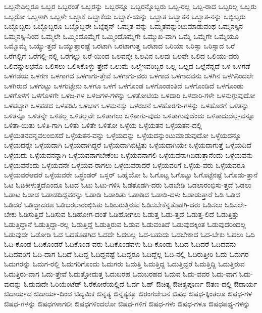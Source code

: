{ಒಬ್ಬನೇಎಲ್ಲರೂ
ಒಬ್ಬರ
ಒಬ್ಬರಂತೆ
ಒಬ್ಬರನ್ನು
ಒಬ್ಬರನ್ನೂ
ಒಬ್ಬರನ್ನೊಬ್ಬರು
ಒಬ್ಬ-ರಲ್ಲ
ಒಬ್ಬ-ರಾದ
ಒಬ್ಬರಿಲ್ಲ
ಒಬ್ಬರು
ಒಬ್ಬರೋ
ಒಬ್ಬಳಾಗಿ
ಒಬ್ಬಳೇ
ಒಬ್ಬಾಕೆ
ಒಬ್ಬಾಕೆಯ
ಒಬ್ಬಾಕೆ-ಯನ್ನು
ಒಬ್ಬಾತ
ಒಬ್ಬಾತನ
ಒಬ್ಬಾತ-ನನ್ನು
ಒಬ್ಬಿಬ್ಬರು
ಒಬ್ಬೊಬ್ಬರು
ಒಬ್ಬೊಬ್ಬರೂ
ಒಬ್ಬೊಬ್ಬರೇ
ಒಬ್ಸೆಶ್ಶನ್
ಒಮ್ಮತ-ವನ್ನು
ಒಮ್ಮತವನ್ನುಂಟುಮಾಡುವಂಥ
ಒಮ್ಮನಸ್ಸಿನ
ಒಮ್ಮನಸ್ಸಿ-ನಿಂದ
ಒಮ್ಮಲೇ
ಒಮ್ಮಿಂದೊಮ್ಮೆಗೆ
ಒಮ್ಮಿಂದೊಮ್ಮೆಗೇ
ಒಮ್ಮುಖ-ವಾಗಿ
ಒಮ್ಮೆ
ಒಮ್ಮೆಗೇ
ಒಮ್ಮೆಯೂ
ಒಮ್ಮೊಮ್ಮೆ
ಒಯ್ಯು-ತ್ತದೆ
ಒಯ್ಯುತ್ತಾರಷ್ಟೆ
ಒರಟಾಗಿ
ಒರಟಾಗುತ್ತ
ಒರಟಾದ
ಒರಿಯಾ
ಒರಿಸ್ಸಾ
ಒರಿಸ್ಸಾದ
ಒರೆ
ಒರೆಗಲ್ಲಿಗೆ
ಒರೆಗಲ್ಲಿ-ನಲ್ಲಿ
ಒರೆಗಲ್ಲು
ಒರೆ-ಯಿಂದ
ಒಲವನ್ನೇ
ಒಲವಿನ
ಒಲವು
ಒಲವೇ
ಒಲಿದ
ಒಲಿಯು-ವರು
ಒಲಿವನ್ಸುಲಭನೊ
ಒಲಿಸಲು
ಒಲಿಸಿಕೊಳ್ಳು-ತ್ತೇನೆ
ಒಲುಮೆ
ಒಲ್ಮೆಇವರಿಬ್ಬರ
ಒಲ್ಲ
ಒಲ್ಲದ
ಒಲ್ಲೆನೆನ್ನದೆ
ಒಳ
ಒಳಗಡೆ
ಒಳಗಡೆಯ
ಒಳಗಣ
ಒಳಗಾಗದ
ಒಳಗಾಗು-ತ್ತೇವೆ
ಒಳಗಾಗು-ವರು
ಒಳಗಾದ
ಒಳಗಾದವನು
ಒಳಗಿನ
ಒಳಗಿನಿಂದಲೇ
ಒಳಗಿರುವ
ಒಳಗುಟ್ಟು
ಒಳಗುಟ್ಟೇನು
ಒಳಗೂ
ಒಳಗೆ
ಒಳಗೊಂಡ
ಒಳಗೊಂಡಂತಿದೆ
ಒಳಗೊಂಡಿದೆ
ಒಳಗೊಂಡು
ಒಳಗೊಳಗೆ
ಒಳಗೊಳಗೇ
ಒಳಜ-ಗಳ
ಒಳಜಗಳ-ಗಳನ್ನು
ಒಳತೋಟಿಯ
ಒಳದಾರಿ
ಒಳದಾರಿ-ಗಳೇ
ಒಳನುಗ್ಗುವುದೋ
ಒಳಪಟ್ಟಾಗ
ಒಳಪಡದ
ಒಳಪಡಿಸಿ
ಒಳಭಾಗ
ಒಳಮನಸ್ಸು
ಒಳರಚನೆ
ಒಳಹೊರಗು-ಗಳನ್ನು
ಒಳಹೊರಗೆ
ಒಳಿತನ್ನು
ಒಳಿತನ್ನೂ
ಒಳಿತನ್ನೇ
ಒಳಿತಲ್ಲ
ಒಳಿತಲ್ಲವೇ
ಒಳಿತಾಗಲು
ಒಳಿತಾಗು-ವುದು
ಒಳಿತಾಗುವುದೆಂದು
ಒಳಿತಾದುದೆಲ್ಲ-ವನ್ನೂ
ಒಳಿತಾ-ಯಿತು
ಒಳಿತಿ-ಗಾಗಿ
ಒಳಿತು
ಒಳಿತೇ
ಒಳಿತೋ
ಒಳ್ಳೆಯ
ಒಳ್ಳೆಯತನ
ಒಳ್ಳೆಯತನ-ದಲ್ಲಿ
ಒಳ್ಳೆಯತನವನ್ನವಲಂಬಿಸದೆ
ಒಳ್ಳೆಯತನ-ವನ್ನು
ಒಳ್ಳೆಯದನ್ನು
ಒಳ್ಳೆಯದನ್ನುಂಟುಮಾಡುವುದೋ
ಒಳ್ಳೆಯದನ್ನೂ
ಒಳ್ಳೆಯದನ್ನೇ
ಒಳ್ಳೆಯದಾಗಿ
ಒಳ್ಳೆಯದಾಗಿದ್ದರೆ
ಒಳ್ಳೆಯದಾಗಿಬಿಟ್ಟಿತು
ಒಳ್ಳೆಯದಾಗಿಯೇ
ಒಳ್ಳೆಯದಾಗುತ್ತೆ
ಒಳ್ಳೆಯದಿದೆ
ಒಳ್ಳೆಯದು
ಒಳ್ಳೆಯವನನ್ನಾಗಿ
ಒಳ್ಳೆಯವನಾಗಬೇಕೆಂಬ
ಒಳ್ಳೆಯವನಾಗಲಿ
ಒಳ್ಳೆಯವನಾಗಿಬಿಡುತ್ತಾನೆಂದು
ಒಳ್ಳೆಯವನು
ಒಳ್ಳೆಯವನೆಂದು
ಒಳ್ಳೆಯವನೇ
ಒಳ್ಳೆಯವ-ರಾಗಲು
ಒಳ್ಳೆಯವರಾದರೆ
ಒಳ್ಳೆಯವರಿಗೆ
ಒಳ್ಳೆಯ-ವರು
ಒಳ್ಳೆಯವರೂ
ಒಳ್ಳೆಯವರೆಆದರೆ
ಒಳ್ಳೆಯವರೇ
ಒಸ್ಟ್ರೆಂಡರ್
ಒಸ್ಲರ್
ಒಹೈಯೋ
ಓ
ಓಗೊಟ್ಟ
ಓಗೊಟ್ಟು
ಓಗೊಟ್ಟೆನಷ್ಟೆ
ಓಗೊಡು-ತ್ತಾನೆ
ಓಟ
ಓಟಕೀಳುತ್ತದೆಎಂದೂ
ಓಟದ
ಓಟು
ಓಟು-ಗಳಿಸಿ
ಓಡತೊಡಗಿ-ದರು
ಓಡಬೇಡಿ
ಓಡಲಾರಂಭಿಸು-ತ್ತದೆ
ಓಡಲು
ಓಡಾಟ
ಓಡಾಡ
ಓಡಾಡದಿದ್ದವರನ್ನು
ಓಡಾಡಿ
ಓಡಾಡಿತು
ಓಡಾಡಿದ
ಓಡಾಡಿ-ದಳು
ಓಡಾಡುತ್ತಾರೆ
ಓಡಿ
ಓಡಿದ
ಓಡಿದರೆ
ಓಡಿದ್ದಾದರೂ
ಓಡಿಬರಲಾರಂಭಿಸಿತು
ಓಡಿಬರುತ್ತಿರುವ
ಓಡಿಸಬೇಕೆನ್ನತೊಡಗಿ-ದರು
ಓಡಿಸಲು
ಓಡಿಸಲೇ-ಬೇಕು
ಓಡಿಸುತ್ತಿದೆ
ಓಡಿಸುವ
ಓಡಿಹೋಗ-ದಂತೆ
ಓಡಿಹೋಗಲು
ಓಡುತ್ತ
ಓಡು-ತ್ತದೆ
ಓಡುತ್ತ-ಲಿದೆ
ಓಡುತ್ತಿತ್ತು
ಓಡುತ್ತಿದ್ದಾನೆ
ಓಡುತ್ತಿದ್ದಾ-ರಲ್ಲ
ಓಡುತ್ತಿದ್ದೆ
ಓಡುತ್ತಿರುವ
ಓಡುವ
ಓಡುವಂತಿದೆ
ಓಡುವುದಕ್ಕಿಂತ
ಓಡುವುದರಿಂದಲ್ಲ
ಓಡುವುದೇ
ಓಡೋಡಿ
ಓದ
ಓದತೊಡಗಿದ
ಓದದೇ
ಓದಬಲ್ಲ
ಓದ-ಬಹುದು
ಓದಬೇಕಾದ
ಓದ-ಬೇಕು
ಓದಲು
ಓದಿ
ಓದಿ-ಕೊಂಡ
ಓದಿಕೊಂಡರೆ
ಓದಿಕೊಂಡ-ವರು
ಓದಿಕೊಂಡವಳು
ಓದಿ-ಕೊಂಡು
ಓದಿದ
ಓದಿದರೆ
ಓದಿದವನು
ಓದಿದವರಿಗೆ
ಓದಿ-ದಾಗ
ಓದಿದೆ
ಓದಿದ್ದ
ಓದಿದ್ದನಷ್ಟೆ
ಓದಿದ್ದರೂ
ಓದಿದ್ದೆಲ್ಲ
ಓದಿ-ನಲ್ಲಿ
ಓದಿರುತ್ತೀರಿ
ಓದು
ಓದುಗರ
ಓದುಗರನ್ನು
ಓದುಗ-ರಲ್ಲಿ
ಓದುಗರಿಗೊಂದು
ಓದುಗರು
ಓದುತ್ತಿ
ಓದುತ್ತಿದ್ದ
ಓದುತ್ತಿದ್ದರೆ
ಓದುತ್ತಿದ್ದಿ
ಓದುತ್ತಿರುವ
ಓದುತ್ತಿರು-ವಾಗ
ಓದು-ತ್ತೇವೆ
ಓದುತ್ತೋದುತ್ತ
ಓದುಬರಹ
ಓದುಬರಹದ
ಓದುವ
ಓದು-ವವರ
ಓದು-ವಾಗ
ಓದು-ವುದನ್ನು
ಓದುವುದೇ
ಓರಿಯೆಂಟೆಡ್
ಓರೆಕೋರೆಯಲ್ಲಿದೆ
ಓರ್ವ
ಓಹ್
ಔಚಿತ್ಯ
ಔಚಿತ್ಯಪೂರ್ಣ
ಔತಣ-ದಲ್ಲಿ
ಔದಾರ್ಯ
ಔದಾರ್ಯದ
ಔದಾರ್ಯ-ದಿಂದ
ಔದ್ಯಮಿಕ
ಔನ್ನತ್ಯ
ಔನ್ನತ್ಯಕ್ಕೂ
ಔರಂಗಜೇಬನ
ಔಷಧ
ಔಷಧ-ಕ್ಕಿಂತಲೂ
ಔಷಧ-ಗಳ
ಔಷಧ-ಗಳನ್ನು
ಔಷಧಗಳಾಗಲೀ
ಔಷಧಗಳಿಂದಲೋ
ಔಷಧ-ಗಳಿಗೆ
ಔಷಧ-ಗಳು
ಔಷಧ-ಗಳೂ
ಔಷಧಪಥ್ಯ-ಗಳನ್ನು
}
